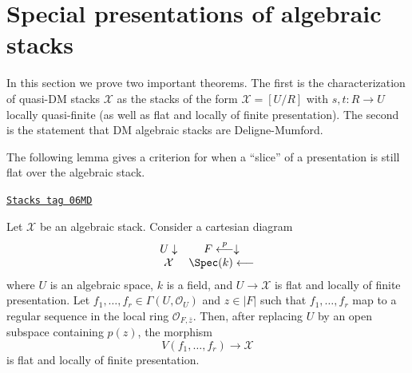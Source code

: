 \section{Special presentations of algebraic stacks}
\label{stacks-morphisms-section-presentations}
In this section we prove two important theorems.
The first is the characterization of quasi-DM stacks $\mathcal{X}$
as the stacks of the form $\mathcal{X} = [U/R]$ with $s, t : R \to U$ locally
quasi-finite (as well as flat and locally of finite presentation).
The second is the statement that DM algebraic stacks are Deligne-Mumford.

\medskip\noindent
The following lemma gives a criterion for when a ``slice''
of a presentation is still flat over the algebraic stack.

\begin{lemma}[Slice]
\label{stacks-morphisms-lemma-slice}
\href{https://stacks.math.columbia.edu/tag/06MD}{\texttt{Stacks tag 06MD}}

Let $\mathcal{X}$ be an algebraic stack.
Consider a cartesian diagram
$$
\begin{array}{cc}U \downarrow & F \overset{p}{\longleftarrow}\downarrow \\ \mathcal{X} & \Spec(k) \longleftarrow\end{array}
$$
where $U$ is an algebraic space, $k$ is a field, and $U \to \mathcal{X}$
is flat and locally of finite presentation. Let
$f_1, \ldots, f_r \in \Gamma(U, \mathcal{O}_U)$
and $z \in |F|$ such that $f_1, \ldots, f_r$ map to a regular sequence
in the local ring $\mathcal{O}_{F, \overline{z}}$.
Then, after replacing $U$ by an open subspace containing $p(z)$, the morphism
$$
V(f_1, \ldots, f_r) \longrightarrow \mathcal{X}
$$
is flat and locally of finite presentation.
\end{lemma}

